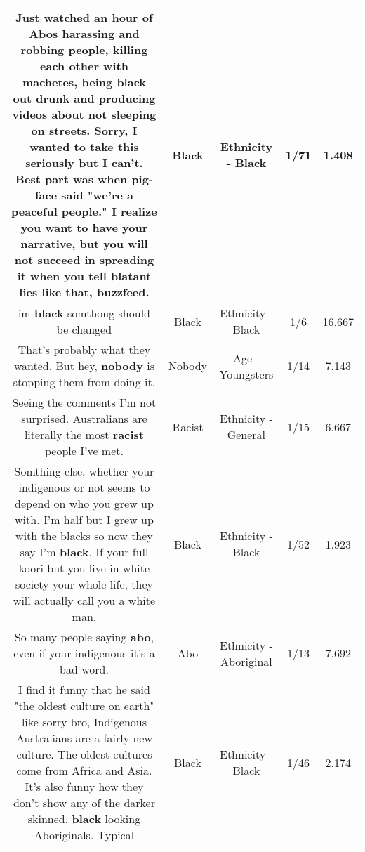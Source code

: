 \documentclass[11pt]{article}
\newlength\mylength
\begin{document}
\begin{center}
\begin{longtable}{|C{.65\mylength}|C{.30\mylength}|C{.12\mylength}|C{.12\mylength}|C{.12\mylength}|}
  \small Just watched an hour of Abos harassing and robbing people, killing each other with machetes, being \textbf{black} out drunk and producing videos about not sleeping on streets. Sorry, I wanted to take this seriously but I can't. Best part was when pig-face said "we're a peaceful people." I realize you want to have your narrative, but you will not succeed in spreading it when you tell blatant lies like that, buzzfeed.\normalsize   & Black & Ethnicity - Black & 1/71 & 1.408 \\  \hline
  \small im \textbf{black} somthong should be changed\normalsize   & Black & Ethnicity - Black & 1/6 & 16.667 \\  \hline
  \small That's probably what they wanted. But hey, \textbf{nobody} is stopping them from doing it.\normalsize   & Nobody & Age - Youngsters & 1/14 & 7.143 \\  \hline
  \small Seeing the comments I'm not surprised. Australians are literally the most \textbf{racist} people I've met.\normalsize   & Racist & Ethnicity - General & 1/15 & 6.667 \\  \hline
  \small Somthing else, whether your indigenous or not seems to depend on who you grew up with. I'm half but I grew up with the blacks so now they say I'm \textbf{black}. If your full koori but you live in white society your whole life, they will actually call you a white man.\normalsize   & Black & Ethnicity - Black & 1/52 & 1.923 \\  \hline
  \small So many people saying \textbf{abo}, even if your indigenous it's a bad word.\normalsize   & Abo & Ethnicity - Aboriginal & 1/13 & 7.692 \\  \hline
  \small I find it funny that he said "the oldest culture on earth" like sorry bro, Indigenous Australians are a fairly new culture. The oldest cultures come from Africa and Asia. It's also funny how they don't show any of the darker skinned, \textbf{black} looking Aboriginals. Typical\normalsize   & Black & Ethnicity - Black & 1/46 & 2.174 \\  \hline

\end{longtable}
\end{center}
\end{document}
